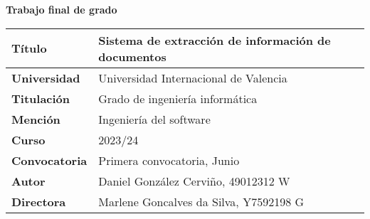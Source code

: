 \noindent
\Huge\textbf{Trabajo final de grado}
\normalfont\normalsize
\vspace{3em}
\begin{table}[h]
    \renewcommand{\arraystretch}{1.5}
    \begin{tabular}{p{} p{}}
        \hline\textbf{Título}       & Sistema de extracción de información de documentos \\
        \hline\textbf{Universidad}  & Universidad Internacional de Valencia              \\
        \hline\textbf{Titulación}   & Grado de ingeniería informática                    \\
        \hline\textbf{Mención}      & Ingeniería del software                            \\
        \hline\textbf{Curso}        & 2023/24                                            \\
        \hline\textbf{Convocatoria} & Primera convocatoria, Junio                        \\
        \hline\textbf{Autor}        & Daniel González Cerviño, 49012312 W                \\
        \hline\textbf{Directora}    & Marlene Goncalves da Silva, Y7592198 G             \\
        \hline
    \end{tabular}
    \label{tab:}
\end{table}
